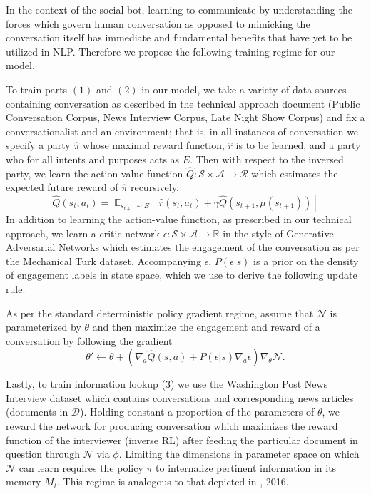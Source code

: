 \documentclass{article} %
\def\expect{\mathop{{\mathbb{E}}}}
\theoremstyle{named}
\def\scripta{{\mathcal A}}
\def\scriptr{{\mathcal R}}
\def\scriptd{{\mathcal D}}
\def\scriptn{{\mathcal N}}
\def\scripts{{\mathcal S}}
\begin{document}
In the context of the social bot, learning to communicate by understanding the forces which govern human conversation as opposed to mimicking the conversation itself has immediate and fundamental benefits that have yet to be utilized in NLP. Therefore we propose the following training regime for our model.

To train parts $(1)$ and $(2)$ in our model, we take a variety of data sources containing conversation as described in the technical approach document (Public Conversation Corpus, News Interview Corpus, Late Night Show Corpus) and fix a conversationalist and an environment; that is, in all instances of conversation we specify a party $\hat{\pi}$ whose maximal reward function, $\hat{r}$ is to be learned, and a party who for all intents and purposes acts as $E$. Then with respect to the inversed party, we learn the action-value function $\hat{Q}: \scripts \times \scripta \to \scriptr$ which estimates the expected future reward of $\hat{\pi}$ recursively.
\begin{equation*}
    \hat{Q}(s_t, a_t) = \expect_{s_{t+1} \sim E}\left[\hat{r}(s_{t}, a_t) + \gamma \hat{Q}(s_{t+1}, \mu(s_{t+1}))\right]
\end{equation*}
In addition to learning the action-value function, as prescribed in our technical approach, we learn a critic network $\epsilon: \scripts \times \scripta \to \mathbb{R}$ in the style of Generative Adversarial Networks \cite{NIPS2014_5423} which estimates the engagement of the conversation as per the Mechanical Turk dataset. Accompanying $\epsilon$, $P(\epsilon | s)$ is a prior on the density of engagement labels in state space, which we use to derive the following update rule.

As per the standard deterministic policy gradient \cite{icml2014c1_silver14} regime, assume that $\scriptn$ is parameterized by $\theta$ and then maximize the engagement and reward of a conversation by following the gradient
\begin{equation*}
	\theta' \leftarrow \theta + \left( \nabla_a \hat{Q}(s, a)  + P(\epsilon | s)\nabla_a \epsilon \right)\nabla_\theta  \scriptn.
\end{equation*}

Lastly, to train information lookup (3) we use the Washington Post News Interview dataset which contains conversations and corresponding news articles (documents in $\scriptd$). Holding constant a proportion of the parameters of $\theta$, we reward the network for producing conversation which maximizes the reward function of the interviewer (inverse RL) after feeding the particular document in question through $\scriptn$ via $\phi.$ Limiting the dimensions in parameter space on which $\scriptn$ can learn requires the policy $\pi$ to internalize pertinent information in its memory $M_t.$ This regime is analogous to that depicted in \citeauthor{DBLP:journals/corr/SantoroBBWL16}, 2016.

\printbibliography
\end{document}
